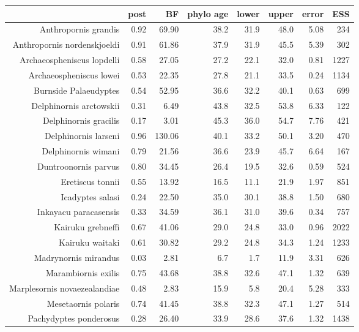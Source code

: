 \begin{table}[ht]
\centering
\begin{tabular}{rrrrrrrr}
  \hline
 & post & BF & phylo age & lower & upper & error & ESS \\ 
  \hline
Anthropornis grandis & 0.92 & 69.90 & 38.2 & 31.9 & 48.0 & 5.08 & 234 \\ 
  Anthropornis nordenskjoeldi & 0.91 & 61.86 & 37.9 & 31.9 & 45.5 & 5.39 & 302 \\ 
  Archaeospheniscus lopdelli & 0.58 & 27.05 & 27.2 & 22.1 & 32.0 & 0.81 & 1227 \\ 
  Archaeospheniscus lowei & 0.53 & 22.35 & 27.8 & 21.1 & 33.5 & 0.24 & 1134 \\ 
  Burnside Palaeudyptes & 0.54 & 52.95 & 36.6 & 32.2 & 40.1 & 0.63 & 699 \\ 
  Delphinornis arctowskii & 0.31 & 6.49 & 43.8 & 32.5 & 53.8 & 6.33 & 122 \\ 
  Delphinornis gracilis & 0.17 & 3.01 & 45.3 & 36.0 & 54.7 & 7.76 & 421 \\ 
  Delphinornis larseni & 0.96 & 130.06 & 40.1 & 33.2 & 50.1 & 3.20 & 470 \\ 
  Delphinornis wimani & 0.79 & 21.56 & 36.6 & 23.9 & 45.7 & 6.64 & 167 \\ 
  Duntroonornis parvus & 0.80 & 34.45 & 26.4 & 19.5 & 32.6 & 0.59 & 524 \\ 
  Eretiscus tonnii & 0.55 & 13.92 & 16.5 & 11.1 & 21.9 & 1.97 & 851 \\ 
  Icadyptes salasi & 0.24 & 22.50 & 35.0 & 30.1 & 38.8 & 1.50 & 680 \\ 
  Inkayacu paracasensis & 0.33 & 34.59 & 36.1 & 31.0 & 39.6 & 0.34 & 757 \\ 
  Kairuku grebneffi & 0.67 & 41.06 & 29.0 & 24.8 & 33.0 & 0.96 & 2022 \\ 
  Kairuku waitaki & 0.61 & 30.82 & 29.2 & 24.8 & 34.3 & 1.24 & 1233 \\ 
  Madrynornis mirandus & 0.03 & 2.81 & 6.7 & 1.7 & 11.9 & 3.31 & 626 \\ 
  Marambiornis exilis & 0.75 & 43.68 & 38.8 & 32.6 & 47.1 & 1.32 & 639 \\ 
  Marplesornis novaezealandiae & 0.48 & 2.83 & 15.9 & 5.8 & 20.4 & 5.28 & 333 \\ 
  Mesetaornis polaris & 0.74 & 41.45 & 38.8 & 32.3 & 47.1 & 1.27 & 514 \\ 
  Pachydyptes ponderosus & 0.28 & 26.40 & 33.9 & 28.6 & 37.6 & 1.32 & 1438 \\ 

\end{tabular}
\end{table}

